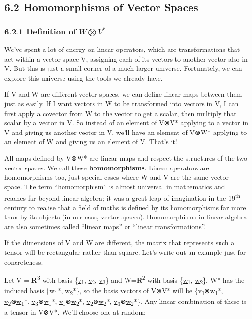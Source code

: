\documentclass[oneside,english]{amsbook}
\numberwithin{section}{chapter}
\theoremstyle{plain}
\theoremstyle{definition}
\begin{document}
\subsection{6.2 Homomorphisms of Vector
	Spaces}\label{homomorphisms-of-vector-spaces}

\subsubsection{\texorpdfstring{6.2.1 Definition of
		\(W\bigotimes V^{*}\)}{6.2.1 Definition of W\textbackslash bigotimes V\^{}\{*\}}}\label{definition-of-wbigotimes-v}

We've spent a lot of energy on linear operators, which are
transformations that act within a vector space V, assigning each of its
vectors to another vector also in V. But this is just a small corner of
a much larger universe. Fortunately, we can explore this universe using
the tools we already have.

If V and W are different vector spaces, we can define linear maps
between them just as easily. If I want vectors in W to be transformed
into vectors in V, I can first apply a covector from W to the vector to
get a scalar, then multiply that scalar by a vector in V. So instead of
an element of V⊗V* applying to a vector in V and giving us another
vector in V, we'll have an element of V⊗W* applying to an element of W
and giving us an element of V. That's it!

All maps defined by V⊗W* are linear maps and respect the structures of
the two vector spaces. We call these \textbf{homomorphisms}. Linear
operators are homomorphisms too, just special cases where W and V are
the same vector space. The term ``homomorphism'' is almost universal in
mathematics and reaches far beyond linear algebra; it was a great leap
of imagination in the 19\textsuperscript{th} century to realise that a
field of maths is defined by its homomorphisms far more than by its
objects (in our case, vector spaces). Homomorphisms in linear algebra
are also sometimes called ``linear maps'' or ``linear transformations''.

If the dimensions of V and W are different, the matrix that represents
such a tensor will be rectangular rather than square. Let's write out an
example just for concreteness.

Let V = \textbf{R}\textsuperscript{3} with basis
\{\ul{v}\textsubscript{1}, \ul{v}\textsubscript{2},
\ul{v}\textsubscript{3}\} and W=\textbf{R}\textsuperscript{2} with basis
\{\ul{w}\textsubscript{1}, \ul{w}\textsubscript{2}\}. W* has the induced
basis \{\ul{w}\textsubscript{1}*, \ul{w}\textsubscript{2}*\}, so the
basis vectors of V⊗V* will be
\{\ul{v}\textsubscript{1}⊗\ul{w}\textsubscript{1}*,
\ul{v}\textsubscript{2}⊗\ul{w}\textsubscript{1}*,
\ul{v}\textsubscript{3}⊗\ul{w}\textsubscript{1}*,
\ul{v}\textsubscript{1}⊗\ul{w}\textsubscript{2}*,
\ul{v}\textsubscript{2}⊗\ul{w}\textsubscript{2}*,
\ul{v}\textsubscript{3}⊗\ul{w}\textsubscript{2}*\}. Any linear
combination of these is a tensor in V⊗V*. We'll choose one at random:
\end{document}
